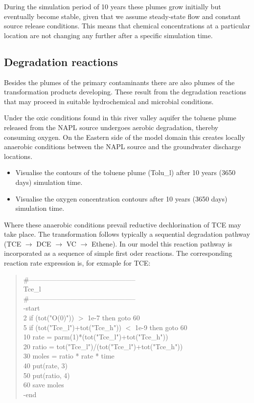 During the simulation period of 10 years these plumes grow initially but eventually become stable, given that we assume steady-state flow and constant source release conditions. This means that chemical concentrations at a particular location are not changing any further after a specific simulation time. 

\subsection[Degradation reactions]{Degradation reactions}

Besides the plumes of the primary contaminants there are also plumes of the transformation products developing. 
These result from the degradation reactions that may proceed in suitable hydrochemical and microbial conditions.

Under the oxic conditions found in this river valley aquifer the toluene plume released from the NAPL source
undergoes aerobic degradation, thereby consuming oxygen. On the Eastern side of the model domain this 
creates locally anaerobic conditions between the NAPL source and the groundwater discharge locations. 

\begin{itemize}

\item Visualise the contours of the toluene plume (Tolu\_l) after 10 years (3650 days) simulation time.

\item Visualise the oxygen concentration contours after 10 years (3650 days) simulation time.
 
\end{itemize}

Where these anaerobic conditions prevail reductive dechlorination of TCE may take place.
The transformation follows typically a sequential degradation pathway 
(TCE $\rightarrow$ DCE $\rightarrow$ VC $\rightarrow$ Ethene).  
In our model this reaction pathway is incorporated as a sequence of simple first oder reactions. 
The corresponding reaction rate expression is, for exmaple for TCE:  \\

{\color{red}
\begin{quote}   
\#----------------------------------------------- \\
Tce\_l		\\
\#----------------------------------------------- \\
  -start \\
2  if (tot("O(0)")) $>$ 1e-7 then goto 60 \\
5  if (tot("Tce\_l")+tot("Tce\_h")) $<$ 1e-9 then goto 60 \\
10 rate = parm(1)*(tot("Tce\_l")+tot("Tce\_h"))	 \\
20 ratio = tot("Tce\_l")/(tot("Tce\_l")+tot("Tce\_h")) \\
30 moles = ratio * rate * time \\
40 put(rate, 3) \\
50 put(ratio, 4) \\
60 save moles \\
-end \\
 \end{quote}
 }


